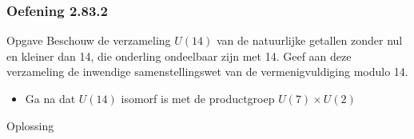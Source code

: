 \documentclass[10pt]{beamer}
\begin{document}
\begin{frame}
	\frametitle{Oefening 2.83.2}
	\begin{block}{Opgave}
		Beschouw de verzameling $U(14)$ van de natuurlijke getallen zonder nul 
		en kleiner dan 14, die onderling ondeelbaar zijn met 14. Geef aan
		deze verzameling de inwendige samenstellingswet van
		de vermenigvuldiging modulo 14.
		\begin{itemize}
			\item Ga na dat $U(14)$ isomorf is 
			met de productgroep $U(7)\times U(2)$
		\end{itemize}
	\end{block}
	\begin{block}{Oplossing}
		
	\end{block}
\end{frame}
\end{document}

